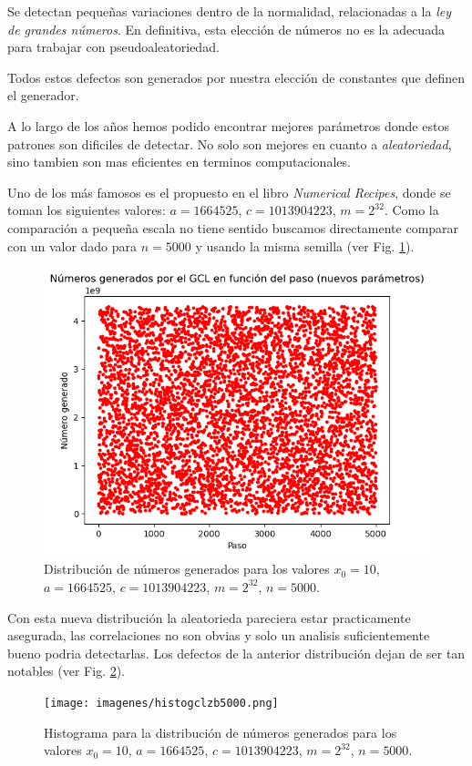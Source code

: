 \documentclass[baaa]{baaa}
\begin{document}
Se detectan pequeñas variaciones dentro de la normalidad, relacionadas a la \textit{ley de grandes números}. En definitiva, esta elección de números no es la adecuada para trabajar con pseudoaleatoriedad.

Todos estos defectos son generados por nuestra elección de constantes que definen el generador.

A lo largo de los años hemos podido encontrar mejores parámetros donde estos patrones son dificiles de detectar. No solo son mejores en cuanto a \textit{aleatoriedad}, sino tambien son mas eficientes en terminos computacionales.

Uno de los más famosos es el propuesto en el libro \textit{Numerical Recipes}\citep{teukolsky1992numerical}, donde se toman los siguientes valores: $a=1664525$, $c=1013904223$, $m=2^{32}$. Como la comparación a pequeña escala no tiene sentido buscamos directamente comparar con un valor dado para $n=5000$ y usando la misma semilla (ver Fig. \ref{gclzb5000}). 

\begin{figure}[!h]
    \centering
    \includegraphics[width=0.9\linewidth]{imagenes/gclzb5000.png}
    \caption{Distribución de números generados para los valores $x_0=10$, $a=1664525$, $c=1013904223$, $m=2^{32}$, $n=5000$. }
    \label{gclzb5000}
\end{figure}


Con esta nueva distribución la aleatorieda pareciera estar practicamente asegurada, las correlaciones no son obvias y solo un analisis suficientemente bueno podria detectarlas. Los defectos de la anterior distribución dejan de ser tan notables (ver Fig. \ref{histogclzb5000}).

\begin{figure}[!h]
    \centering
    \texttt{[image: imagenes/histogclzb5000.png]}
    \caption{Histograma para la distribución de números generados para los valores $x_0=10$, $a=1664525$, $c=1013904223$, $m=2^{32}$, $n=5000$.}
    \label{histogclzb5000}
\end{figure}
\end{document}
